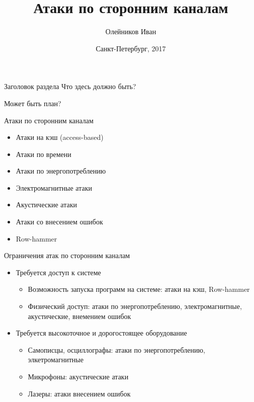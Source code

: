 \documentclass[14pt]{beamer}
\title[Выпускная Квалификационная Работа]{Атаки по сторонним каналам}
\author[]{Олейников Иван}
\institute[]{Университет ИТМО}
\date[]{Санкт-Петербург, 2017}
\begin{document}
\itmologoslide

\begin{darkbars}
    \begin{frame}
        \titlepage
    \end{frame}
\end{darkbars}

\begin{frame}
    \itmoanothertitle
\end{frame}

\begin{frame}[englogoheader]{Заголовок раздела}
Что здесь должно быть?

Может быть план?
\end{frame}

\begin{frame}{Атаки по сторонним каналам}
    \begin{itemize}
        \item Атаки на кэш (access-based)
        \item Атаки по времени
        \item Атаки по энергопотреблению
        \item Электромагнитные атаки
        \item Акустические атаки
        \item Атаки со внесением ошибок
        \item Row-hammer
    \end{itemize}
\end{frame}

\begin{frame}{Ограничения атак по сторонним каналам}
    \begin{itemize}
        \item Требуется доступ к системе
            \begin{itemize}
                \item Возможность запуска программ на системе: атаки на кэш, Row-hammer
                \item Физический доступ: атаки по энергопотреблению, электромагнитные, акустические, внемением ошибок
            \end{itemize}
        \item Требуется высокоточное и дорогостоящее оборудование
            \begin{itemize}
                \item Самописцы, осциллографы: атаки по энергопотреблению, элкетромагнитные
                \item Микрофоны: акустические атаки
                \item Лазеры: атаки внесением ошибок
            \end{itemize}
    \end{itemize}
\end{frame}
\end{document}
